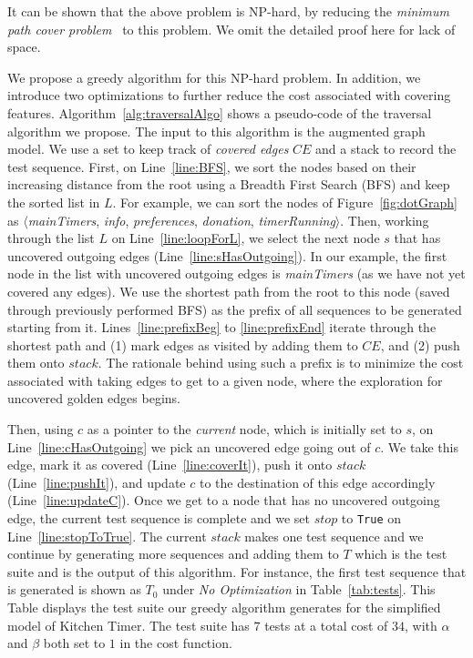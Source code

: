 It can be shown that the above problem is NP-hard, by reducing the \textit{minimum path cover problem}~\cite{PathCover:NtafosH79} to this problem. We omit the detailed proof here for lack of space.

We propose a greedy algorithm for this NP-hard problem. In addition, we introduce two optimizations to further reduce the cost associated with covering features. Algorithm~\ref{alg:traversalAlgo} shows a pseudo-code of the traversal algorithm we propose. The input to this algorithm is the augmented graph model. We use a set to keep track of \emph{covered edges} $CE$ and a stack to record the test sequence. First, on Line~\ref{line:BFS}, we sort the nodes based on their increasing distance from the root using a Breadth First Search (BFS) and keep the sorted list in $L$. For example, we can sort the nodes of Figure~\ref{fig:dotGraph} as $\langle$\emph{mainTimers}, \emph{info}, \emph{preferences}, \emph{donation}, \emph{timerRunning}$\rangle$. Then, working through the list $L$ on Line~\ref{line:loopForL}, we select the next node $s$ that has uncovered outgoing edges (Line~\ref{line:sHasOutgoing}). In our example, the first node in the list with uncovered outgoing edges is \emph{mainTimers} (as we have not yet covered any edges). We use the shortest path from the root to this node (saved through previously performed BFS) as the prefix of all sequences to be generated starting from it. Lines~\ref{line:prefixBeg} to \ref{line:prefixEnd} iterate through the shortest path and (1) mark edges as visited by adding them to $CE$, and (2) push them onto $stack$. The rationale behind using such a prefix is to minimize the cost associated with taking edges to get to a given node, where the exploration for uncovered golden edges begins. %

%


Then, using $c$ as a pointer to the \emph{current} node, which is initially set to $s$, on Line~\ref{line:cHasOutgoing} we pick an uncovered edge going out of $c$. We take this edge, mark it as covered (Line~\ref{line:coverIt}), push it onto $stack$ (Line~\ref{line:pushIt}), and update $c$ to the destination of this edge accordingly (Line~\ref{line:updateC}). Once we get to a node that has no uncovered outgoing edge, the current test sequence is complete and we set $stop$ to {\small\texttt{True}} on Line~\ref{line:stopToTrue}. The current $stack$ makes one test sequence and we continue by generating more sequences and adding them to $T$ which is the test suite and is the output of this algorithm. For instance, the first test sequence that is generated is shown as $T_0$ under \emph{No Optimization} in Table~\ref{tab:tests}. This Table displays the test suite our greedy algorithm generates for the simplified model of Kitchen Timer. The test suite has $7$ tests at a total cost of $34$, with $\alpha$ and $\beta$ both set to $1$ in the cost function.


